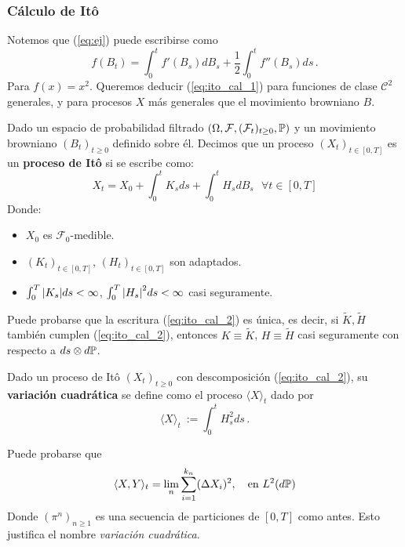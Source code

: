 \subsubsection{Cálculo de It\^{o}}

Notemos que (\ref{eq:ej}) puede escribirse como
\begin{equation*}
    \label{eq:ito_cal_1}
    \tag{**}
    f(B_t) = \int_{0}^t f'(B_s) dB_s + \frac{1}{2} \int_{0}^{t} f''(B_s) ds\,.
\end{equation*}
Para $f(x) = x^2$. Queremos deducir (\ref{eq:ito_cal_1}) para funciones de clase $\mathcal{C}^2$ generales, y para procesos $X$ más generales que el movimiento browniano $B$. 
\begin{definition}[Proceso de It\^{o}]
Dado un espacio de probabilidad filtrado $(\Omega, \mathcal{F}, (\mathcal{F}_t)_{t \geq 0}, \P)$ y 
un movimiento browniano $(B_t)_{t \ge 0}$ definido sobre él. Decimos
que un proceso $(X_t)_{t \in [0,T]}$ es un \textbf{proceso de It\^{o}} si se escribe como:
\begin{equation*}
    \label{eq:ito_cal_2}
    \tag{***}
    X_t = X_0 + \int_{0}^{t} K_s ds + \int_{0}^{t} H_s dB_s ~ ~ ~ \forall t \in [0,T]
\end{equation*}
Donde:
\begin{itemize}
    \item $X_0$ es $\mathcal{F}_0$-medible. 
    \item $(K_t)_{t \in [0,T]}$, $(H_t)_{t \in [0,T]}$ son adaptados. 
    \item $\int_{0}^{T} \abs{K_s} ds < \infty$, $\int_{0}^{T} \abs{H_s}^2 ds < \infty$ casi seguramente.
\end{itemize}
\end{definition}

\begin{remark}
    Puede probarse que la escritura (\ref{eq:ito_cal_2}) es única, es decir, si $\tilde{K}, \tilde{H}$        también cumplen (\ref{eq:ito_cal_2}), entonces $K \equiv \tilde{K}$, $H \equiv \tilde{H}$ casi seguramente con respecto a $ds \otimes d\P$. 
\end{remark}

\begin{definition}
Dado un proceso de It\^{o} $(X_t)_{t \ge 0}$ con descomposición (\ref{eq:ito_cal_2}), su \textbf{variación cuadrática} se define como el proceso $\langle X \rangle_t$ dado por
\begin{equation*}
        \langle X \rangle_t ~ := \int_{0}^{t} H^2_s ds \,.
\end{equation*}
\end{definition}
\begin{remark}
    Puede probarse que 
    \begin{equation*}
        \langle X,Y \rangle_t = \lim_{n} \sum_{i=1}^{k_n} (\Delta X_i)^2, ~ ~ \text{ en } L^2({d\P})
    \end{equation*}
    Donde $(\pi^{n})_{n \ge 1}$ es una secuencia de particiones de $[0,T]$ como antes. Esto justifica el nombre \textit{variación cuadrática}.
\end{remark}

